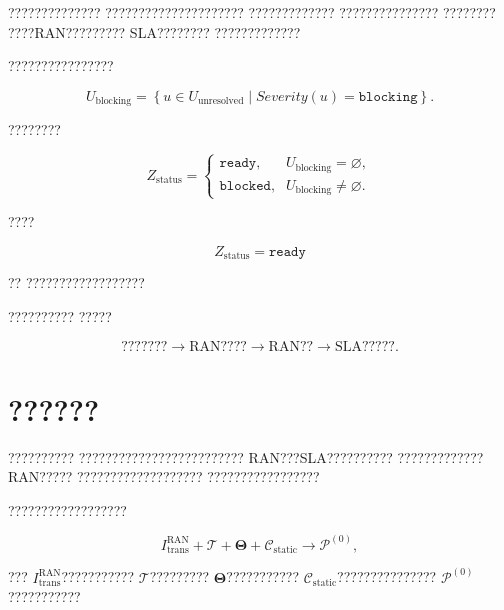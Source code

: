 ??????????????
?????????????????????
?????????????
???????????????
????????
????RAN?????????
SLA????????
?????????????

????????????????

\begin{equation}
U_{\mathrm{blocking}}
=
\left\{
u
\in
U_{\mathrm{unresolved}}
\mid
Severity(u)
=
\texttt{blocking}
\right\}.
\label{eq:translation_blocking_items_reduced}
\end{equation}

????????

\begin{equation}
Z_{\mathrm{status}}
=
\begin{cases}
\texttt{ready},
&
U_{\mathrm{blocking}}
=
\varnothing,
\\[2mm]
\texttt{blocked},
&
U_{\mathrm{blocking}}
\neq
\varnothing.
\end{cases}
\label{eq:translation_status_reduced}
\end{equation}

????

\begin{equation}
Z_{\mathrm{status}}
=
\texttt{ready}
\label{eq:translation_ready_reduced}
\end{equation}

??
??????????????????

??????????
?????

\begin{equation}
\text{???????}
\longrightarrow
\text{RAN????}
\longrightarrow
\text{RAN??}
\longrightarrow
\text{SLA?????}.
\label{eq:structured_intent_to_ran_requirement}
\end{equation}

\section{??????}
\label{sec:network_policy_generation}

??????????
?????????????????????????
RAN???SLA??????????
?????????????RAN?????
???????????????????
?????????????????

??????????????????

\begin{equation}
I_{\mathrm{trans}}^{\mathrm{RAN}}
+
\mathcal{T}
+
\boldsymbol{\Theta}
+
\mathcal{C}_{\mathrm{static}}
\longrightarrow
\mathcal{P}^{(0)},
\label{eq:initial_policy_generation_reduced}
\end{equation}

???
$I_{\mathrm{trans}}^{\mathrm{RAN}}$???????????
$\mathcal{T}$?????????
$\boldsymbol{\Theta}$???????????
$\mathcal{C}_{\mathrm{static}}$???????????????
$\mathcal{P}^{(0)}$???????????

